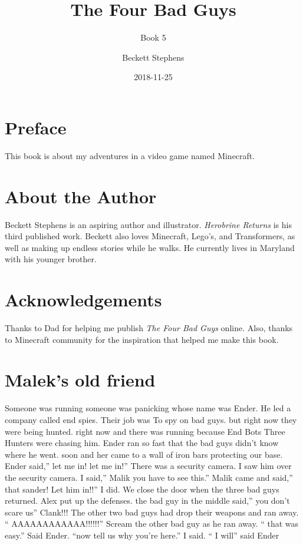 \documentclass[12pt,oneside]{krantz}
\title{The Four Bad Guys}
\subtitle{Book 5}
\author{Beckett Stephens}
\date{2018-11-25}
\begin{document}
\maketitle

{
\setcounter{tocdepth}{1}
\tableofcontents
}
\hypertarget{preface}{%
\chapter*{Preface}\label{preface}}


This book is about my adventures in a video game named Minecraft.

\hypertarget{about-the-author}{%
\chapter*{About the Author}\label{about-the-author}}


Beckett Stephens is an aspiring author and illustrator. \emph{Herobrine
Returns} is his third published work. Beckett also loves Minecraft,
Lego's, and Transformers, as well as making up endless stories while he
walks. He currently lives in Maryland with his younger brother.

\hypertarget{acknowledgements}{%
\chapter*{Acknowledgements}\label{acknowledgements}}


Thanks to Dad for helping me publish \emph{The Four Bad Guys} online.
Also, thanks to Minecraft community for the inspiration that helped me
make this book.

\hypertarget{maleks-old-friend}{%
\chapter{Malek's old friend}\label{maleks-old-friend}}

Someone was running someone was panicking whose name was Ender. He led a
company called end spies. Their job was To spy on bad guys. but right
now they were being hunted. right now and there was running because End
Bots Three Hunters were chasing him. Ender ran so fast that the bad guys
didn't know where he went. soon and her came to a wall of iron bars
protecting our base. Ender said,'' let me in! let me in!'' There was a
security camera. I saw him over the security camera. I said,'' Malik you
have to see this.'' Malik came and said,'' that sander! Let him in!!'' I
did. We close the door when the three bad guys returned. Alex put up the
defenses. the bad guy in the middle said,'' you don't scare us''
Clank!!! The other two bad guys had drop their weapons and ran away. ``
AAAAAAAAAAAA!!!!!!'' Scream the other bad guy as he ran away. `` that
was easy.'' Said Ender. ``now tell us why you're here.'' I said. `` I
will'' said Ender
\end{document}

